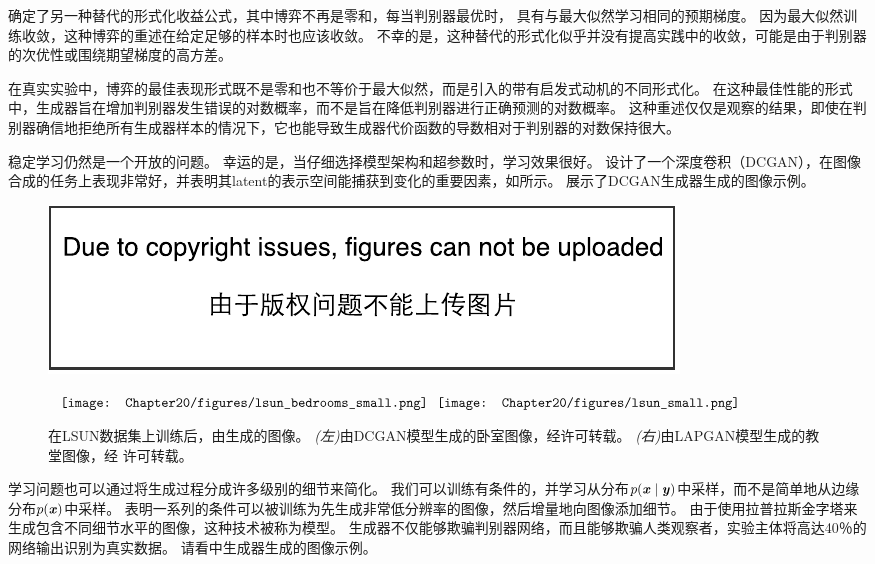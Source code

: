 \citet{Goodfellow-ICLR2015} 确定了另一种替代的形式化收益公式，其中博弈不再是零和，每当判别器最优时， 具有与最大似然学习相同的预期梯度。
因为最大似然训练收敛，这种博弈的重述在给定足够的样本时也应该收敛。
不幸的是，这种替代的形式化似乎并没有提高实践中的收敛，可能是由于判别器的次优性或围绕期望梯度的高方差。


在真实实验中，博弈的最佳表现形式既不是零和也不等价于最大似然，而是\citet{Goodfellow-et-al-NIPS2014-small}引入的带有启发式动机的不同形式化。
在这种最佳性能的形式中，生成器旨在增加判别器发生错误的对数概率，而不是旨在降低判别器进行正确预测的对数概率。
这种重述仅仅是观察的结果，即使在判别器确信地拒绝所有生成器样本的情况下，它也能导致生成器代价函数的导数相对于判别器的对数保持很大。

稳定学习仍然是一个开放的问题。
幸运的是，当仔细选择模型架构和超参数时，学习效果很好。
\citet{radford2015unsupervised}设计了一个深度卷积（DCGAN），在图像合成的任务上表现非常好，并表明其\gls{latent}的表示空间能捕获到变化的重要因素，如所示。
展示了DCGAN生成器生成的图像示例。
 
\begin{figure}[!htb]
\ifOpenSource
\centerline{\includegraphics{figure.pdf}}
\else
\centering
$\vcenter{\hbox{
\texttt{[image: Chapter20/figures/lsun\_bedrooms\_small.png]}
}}
\vcenter{\hbox{
\texttt{[image: Chapter20/figures/lsun\_small.png]}
}}$
\fi
\caption{在LSUN数据集上训练后，由生成的图像。
\emph{(左)}由DCGAN模型生成的卧室图像，经\citet{radford2015unsupervised}许可转载。
\emph{(右)}由LAPGAN模型生成的教堂图像，经 \citet{denton2015deep}许可转载。
}
\label{fig:chap20_lsun_small}
\end{figure}

学习问题也可以通过将生成过程分成许多级别的细节来简化。
我们可以训练有条件的\citep{mirza2014conditional}，并学习从分布$p(\boldsymbol{\mathit{x}} \mid \boldsymbol{\mathit{y}})$中采样，而不是简单地从边缘分布$p(\boldsymbol{\mathit{x}})$中采样。
\citet{denton2015deep} 表明一系列的条件可以被训练为先生成非常低分辨率的图像，然后增量地向图像添加细节。
由于使用拉普拉斯金字塔来生成包含不同细节水平的图像，这种技术被称为模型。
生成器不仅能够欺骗判别器网络，而且能够欺骗人类观察者，实验主体将高达40％的网络输出识别为真实数据。
请看中生成器生成的图像示例。



